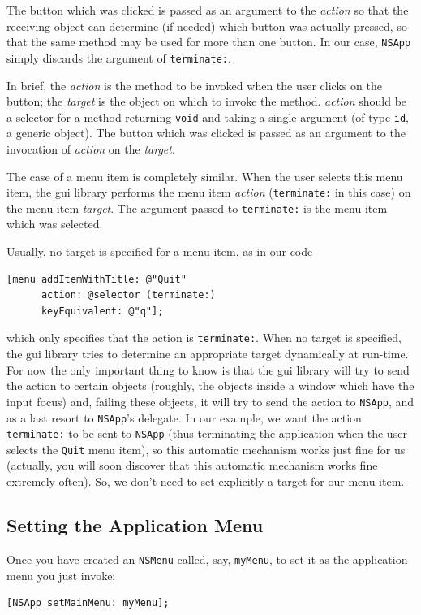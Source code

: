 \documentclass[a4paper]{article}
\begin{document}
The button which was clicked is passed as an argument to the
\emph{action} so that the receiving object can determine (if needed)
which button was actually pressed, so that the same method may be used
for more than one button.  In our case, \texttt{NSApp} simply discards
the argument of \texttt{terminate:}.

In brief, the \emph{action} is the method to be invoked when the user
clicks on the button; the \emph{target} is the object on which to
invoke the method.  \emph{action} should be a selector for a method
returning \texttt{void} and taking a single argument (of type
\texttt{id}, a generic object).  The button which was clicked is
passed as an argument to the invocation of \emph{action} on the
\emph{target}.

The case of a menu item is completely similar.  When the user selects
this menu item, the gui library performs the menu item \emph{action}
(\texttt{terminate:} in this case) on the menu item \emph{target}.
The argument passed to \texttt{terminate:} is the menu item which was
selected.

Usually, no target is specified for a menu item, as in our code 
\begin{verbatim}  
[menu addItemWithTitle: @"Quit" 
      action: @selector (terminate:)
      keyEquivalent: @"q"];	
\end{verbatim}
which only specifies that the action is \texttt{terminate:}.  When no
target is specified, the gui library tries to determine an appropriate
target dynamically at run-time.  For now the only important thing to
know is that the gui library will try to send the action to certain
objects (roughly, the objects inside a window which have the input
focus) and, failing these objects, it will try to send the action to
\texttt{NSApp}, and as a last resort to \texttt{NSApp}'s delegate.  In
our example, we want the action \texttt{terminate:} to be sent to
\texttt{NSApp} (thus terminating the application when the user selects
the \texttt{Quit} menu item), so this automatic mechanism works just
fine for us (actually, you will soon discover that this automatic
mechanism works fine extremely often).  So, we don't need to set
explicitly a target for our menu item.

\subsection{Setting the Application Menu}
Once you have created an \texttt{NSMenu} called, say, \texttt{myMenu}, 
to set it as the application menu you just invoke:
\begin{verbatim}
[NSApp setMainMenu: myMenu];
\end{verbatim}
\end{document}
